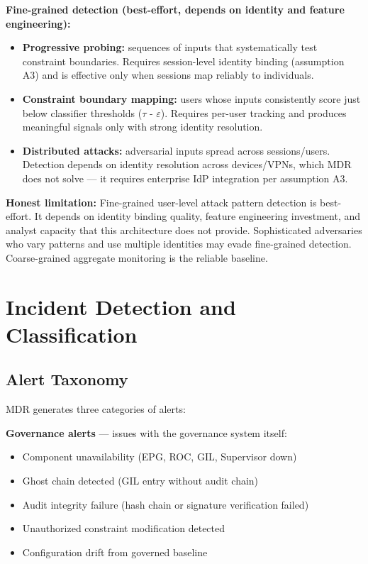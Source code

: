\textbf{Fine-grained detection (best-effort, depends on identity and feature engineering):}
\begin{itemize}
  \item \textbf{Progressive probing:} sequences of inputs that systematically test constraint boundaries. Requires session-level identity binding (assumption A3) and is effective only when sessions map reliably to individuals.
  \item \textbf{Constraint boundary mapping:} users whose inputs consistently score just below classifier thresholds ($\tau$ - $\varepsilon$). Requires per-user tracking and produces meaningful signals only with strong identity resolution.
  \item \textbf{Distributed attacks:} adversarial inputs spread across sessions/users. Detection depends on identity resolution across devices/VPNs, which MDR does not solve --- it requires enterprise IdP integration per assumption A3.
\end{itemize}


\textbf{Honest limitation:} Fine-grained user-level attack pattern detection is best-effort. It depends on identity binding quality, feature engineering investment, and analyst capacity that this architecture does not provide. Sophisticated adversaries who vary patterns and use multiple identities may evade fine-grained detection. Coarse-grained aggregate monitoring is the reliable baseline.



\section{Incident Detection and Classification}
\label{sec:monitoring-4}


\subsection{Alert Taxonomy}


MDR generates three categories of alerts:

\textbf{Governance alerts} --- issues with the governance system itself:
\begin{itemize}
  \item Component unavailability (EPG, ROC, GIL, Supervisor down)
  \item Ghost chain detected (GIL entry without audit chain)
  \item Audit integrity failure (hash chain or signature verification failed)
  \item Unauthorized constraint modification detected
  \item Configuration drift from governed baseline
\end{itemize}


